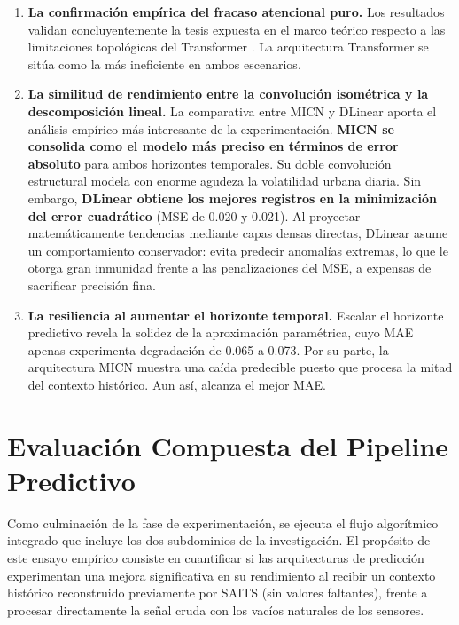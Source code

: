 \begin{enumerate}
	\item \textbf{La confirmación empírica del fracaso atencional puro.}
	Los resultados validan concluyentemente la tesis expuesta en el marco teórico respecto a las limitaciones topológicas del Transformer \parencite{zeng2023are}. La arquitectura Transformer se sitúa como la más ineficiente en ambos escenarios. 
	
	\item \textbf{La similitud de rendimiento entre la convolución isométrica y la descomposición lineal.}
	La comparativa entre MICN y DLinear aporta el análisis empírico más interesante de la experimentación. \textbf{MICN se consolida como el modelo más preciso en términos de error absoluto} para ambos horizontes temporales. Su doble convolución estructural modela con enorme agudeza la volatilidad urbana diaria. Sin embargo, \textbf{DLinear obtiene los mejores registros en la minimización del error cuadrático} (MSE de 0.020 y 0.021). Al proyectar matemáticamente tendencias mediante capas densas directas, DLinear asume un comportamiento conservador: evita predecir anomalías extremas, lo que le otorga gran inmunidad frente a las penalizaciones del MSE, a expensas de sacrificar precisión fina.
	
	\item \textbf{La resiliencia al aumentar el horizonte temporal.}
	Escalar el horizonte predictivo revela la solidez de la aproximación paramétrica, cuyo MAE apenas experimenta degradación de 0.065 a 0.073. Por su parte, la arquitectura MICN muestra una caída predecible puesto que procesa la mitad del contexto histórico. Aun así, alcanza el mejor MAE.
\end{enumerate}





\section{Evaluación Compuesta del Pipeline Predictivo}
\label{sec:pipeline_results}

Como culminación de la fase de experimentación, se ejecuta el flujo algorítmico integrado que incluye los dos subdominios de la investigación. El propósito de este ensayo empírico consiste en cuantificar si las arquitecturas de predicción experimentan una mejora significativa en su rendimiento al recibir un contexto histórico reconstruido previamente por SAITS (sin valores faltantes), frente a procesar directamente la señal cruda con los vacíos naturales de los sensores.

